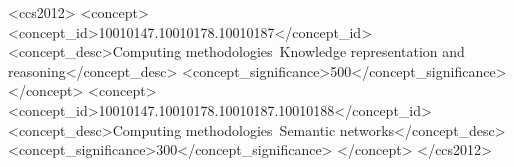 \documentclass[sigconf, anonymous, review]{acmart}
\begin{document}

\author{Yunjun Gao$^{*\dagger}$, Xiaoze Liu$^{*\dagger}$, Junyang Wu$^{\dagger}$, Tianyi Li$^{\S}$, Pengfei Wang$^{\dagger}$,  Lu Chen$^{\dagger}$}

\renewcommand{\shortauthors}{Gao et al.}




\begin{CCSXML}
<ccs2012>
<concept>
<concept_id>10010147.10010178.10010187</concept_id>
<concept_desc>Computing methodologies~Knowledge representation and reasoning</concept_desc>
<concept_significance>500</concept_significance>
</concept>
<concept>
<concept_id>10010147.10010178.10010187.10010188</concept_id>
<concept_desc>Computing methodologies~Semantic networks</concept_desc>
<concept_significance>300</concept_significance>
</concept>
</ccs2012>
\end{CCSXML}




\maketitle








\pagebreak
\begin{appendices}

\end{appendices}

\balance
\end{document}
